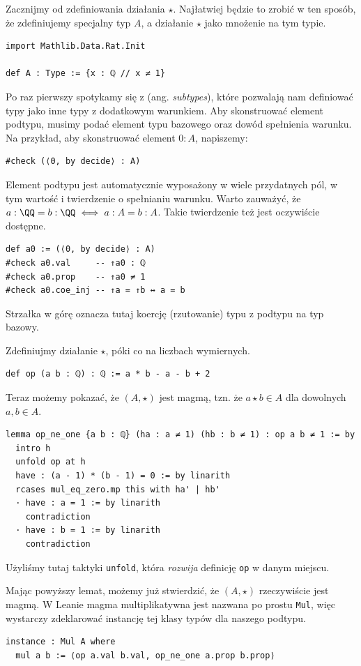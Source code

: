 \documentclass[polish,pretty,bibliography=totocnumbered]{angav}
\newcommand{\Lean}[1]{\texttt{#1}}
\begin{document}
Zacznijmy od zdefiniowania działania $\star$. Najłatwiej będzie to zrobić w ten sposób, że zdefiniujemy specjalny typ $A$, a działanie $\star$ jako mnożenie na tym typie.
\begin{verbatim}
import Mathlib.Data.Rat.Init

def A : Type := {x : ℚ // x ≠ 1}
\end{verbatim}

Po raz pierwszy spotykamy się z  (ang. \textit{subtypes}), które pozwalają nam definiować typy jako inne typy z dodatkowym warunkiem. Aby skonstruować element podtypu, musimy podać element typu bazowego oraz dowód spełnienia warunku. Na przykład, aby skonstruować element $0 : A$, napiszemy:
\begin{verbatim}
#check (⟨0, by decide⟩ : A)
\end{verbatim}
Element podtypu jest automatycznie wyposażony w wiele przydatnych pól, w tym wartość i twierdzenie o spełnianiu warunku. Warto zauważyć, że $a : \QQ = b : \QQ \iff a : A = b : A$. Takie twierdzenie też jest oczywiście dostępne.
\begin{verbatim}
def a0 := (⟨0, by decide⟩ : A)
#check a0.val     -- ↑a0 : ℚ
#check a0.prop    -- ↑a0 ≠ 1
#check a0.coe_inj -- ↑a = ↑b ↔ a = b
\end{verbatim}
Strzałka w górę oznacza tutaj koercję (rzutowanie) typu z podtypu na typ bazowy.

Zdefiniujmy działanie $\star$, póki co na liczbach wymiernych.
\begin{verbatim}
def op (a b : ℚ) : ℚ := a * b - a - b + 2
\end{verbatim}

Teraz możemy pokazać, że $(A, \star)$ jest magmą, tzn. że $a \star b \in A$ dla dowolnych $a, b \in A$.

\begin{verbatim}
lemma op_ne_one {a b : ℚ} (ha : a ≠ 1) (hb : b ≠ 1) : op a b ≠ 1 := by
  intro h
  unfold op at h
  have : (a - 1) * (b - 1) = 0 := by linarith
  rcases mul_eq_zero.mp this with ha' | hb'
  · have : a = 1 := by linarith
    contradiction
  · have : b = 1 := by linarith
    contradiction
\end{verbatim}

Użyliśmy tutaj taktyki \Lean{unfold}, która \emph{rozwija} definicję \Lean{op} w danym miejscu.

Mając powyższy lemat, możemy już stwierdzić, że $(A, \star)$ rzeczywiście jest magmą. W Leanie magma multiplikatywna jest nazwana po prostu \Lean{Mul}, więc wystarczy zdeklarować instancję tej klasy typów dla naszego podtypu.
\begin{verbatim}
instance : Mul A where
  mul a b := ⟨op a.val b.val, op_ne_one a.prop b.prop⟩
\end{verbatim}
\end{document}
